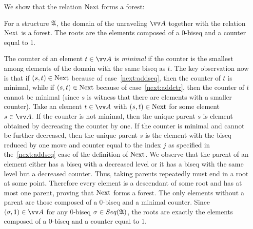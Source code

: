 We show that the relation $\mathrm{Next}$ forms a forest:
\begin{lemma}
  For a structure ${\mathfrak{A}}$, the domain of the unraveling $\unraveldom{A}$ together with the relation $\mathrm{Next}$ is a forest. The roots are the elements composed of a 0-biseq and a counter equal to 1.
\end{lemma}
\begin{proofsketch}
  The counter of an element $t \in \unraveldom{A}$ is \emph{minimal} if the counter is the smallest among elements of the domain with the same biseq as $t$.
  The key observation now is that if $(s,t) \in \mathrm{Next}$ because of case~\ref{next:addseq}, then the counter of $t$ is minimal, while if $(s,t) \in \mathrm{Next}$ because of case~\ref{next:addctr}, then the counter of $t$ cannot be minimal (since $s$ is witness that there are elements with a smaller counter).
  Take an element $t \in \unraveldom{A}$ with $(s, t) \in \mathrm{Next}$ for some element $s \in \unraveldom{A}$.
  If the counter is not minimal, then the unique parent $s$ is element obtained by decreasing the counter by one.
  If the counter is minimal and cannot be further decreased, then the unique parent $s$ is the element with the biseq reduced by one move and counter equal to the index $j$ as specified in the~\ref{next:addseq} case of the definition of $\mathrm{Next}$.
  We observe that the parent of an element either has a biseq with a decreased level or it has a biseq with the same level but a decreased counter.
  Thus, taking parents repeatedly must end in a root at some point.
  Therefore every element is a descendant of some root and has at most one parent, proving that $\mathrm{Next}$ forms a forest.
  The only elements without a parent are those composed of a 0-biseq and a minimal counter.
  Since $(\sigma, 1) \in \unraveldom{A}$ for any 0-biseq $\sigma \in \Seq{A}$, the roots are exactly the elements composed of a 0-biseq and a counter equal to 1.
\end{proofsketch}

